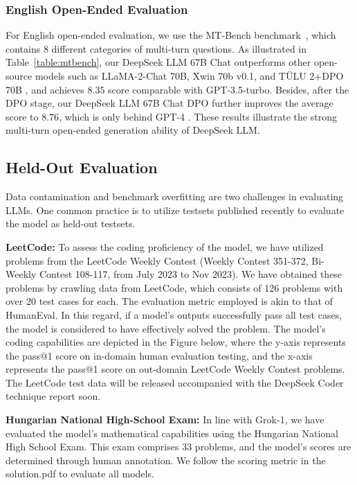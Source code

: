 \subsubsection{English Open-Ended Evaluation} For English open-ended evaluation, we use the MT-Bench benchmark~\citep{mtbench}, which contains 8 different categories of multi-turn questions. As illustrated in Table~\ref{table:mtbench}, our DeepSeek LLM 67B Chat outperforms other open-source models such as LLaMA-2-Chat \cite{llama2} 70B, Xwin 70b v0.1, and TÜLU 2+DPO 70B \citep{tulu2}, and achieves $8.35$ score comparable with GPT-3.5-turbo. Besides, after the DPO stage, our DeepSeek LLM 67B Chat DPO further improves the average score to $8.76$, which is only behind GPT-4 \citep{gpt4}. These results illustrate the strong multi-turn open-ended generation ability of DeepSeek LLM.

\subsection{Held-Out Evaluation} Data contamination and benchmark overfitting are two challenges in evaluating LLMs. One common practice is to utilize testsets published recently to evaluate the model as held-out testsets. 

\textbf{LeetCode: }To assess the coding proficiency of the model, we have utilized problems from the LeetCode Weekly Contest (Weekly Contest 351-372, Bi-Weekly Contest 108-117, from July 2023 to Nov 2023). We have obtained these problems by crawling data from LeetCode, which consists of 126 problems with over 20 test cases for each. The evaluation metric employed is akin to that of HumanEval. In this regard, if a model's outputs successfully pass all test cases, the model is considered to have effectively solved the problem. The model's coding capabilities are depicted in the Figure below, where the y-axis represents the pass@1 score on in-domain human evaluation testing, and the x-axis represents the pass@1 score on out-domain LeetCode Weekly Contest problems. The LeetCode test data will be released accompanied with the DeepSeek Coder technique report soon. 

\textbf{Hungarian National High-School Exam:} In line with Grok-1, we have evaluated the model's mathematical capabilities using the Hungarian National High School Exam. This exam comprises 33 problems, and the model's scores are determined through human annotation. We follow the scoring metric in the solution.pdf to evaluate all models.

